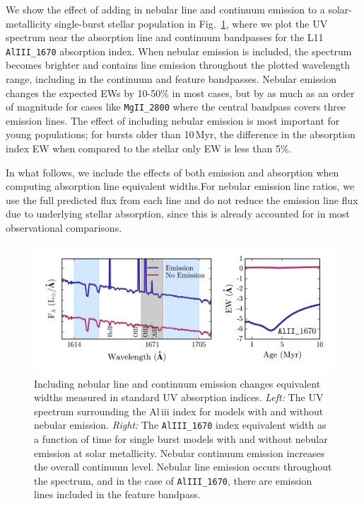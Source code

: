 \documentclass[preprint2,trackchanges]{aastex62}
\newcommand{\Myr}{$\,$Myr\xspace}
\begin{document}
We show the effect of adding in nebular line and continuum emission to a solar-metallicity single-burst stellar population in Fig.~\ref{fig:EWnebular}, where we plot the UV spectrum near the absorption line and continuum bandpasses for the L11 {\tt AlIII\_1670} absorption index. When nebular emission is included, the spectrum becomes brighter and contains line emission throughout the plotted wavelength range, including in the continuum and feature bandpasses. Nebular emission changes the expected EWs by 10-50\% in most cases, but by as much as an order of magnitude for cases like \texttt{MgII\_2800} where the central bandpass covers three emission lines. The effect of including nebular emission is most important for young populations; for bursts older than 10\Myr, the difference in the absorption index EW when compared to the stellar only EW is less than 5\%.

In what follows, we include the effects of both emission and absorption when computing absorption line equivalent widths.For nebular emission line ratios, we use the full predicted flux from each line and do not reduce the emission line flux due to underlying stellar absorption, since this is already accounted for in most observational comparisons.


\begin{figure}
  \begin{center}
    \includegraphics[width=0.9\linewidth]{figs/f3.png}
    \caption{Including nebular line and continuum emission changes equivalent widths measured in standard UV absorption indices. \emph{Left:} The UV spectrum surrounding the Al{\sc \,iii} index for models with and without nebular emission. \emph{Right:} The {\tt AlIII\_1670} index equivalent width as a function of time for single burst models with and without nebular emission at solar metallicity. Nebular continuum emission increases the overall continuum level. Nebular line emission occurs throughout the spectrum, and in the case of {\tt AlIII\_1670}, there are emission lines included in the feature bandpass.}
    \label{fig:EWnebular}
  \end{center}
\end{figure}
\end{document}
